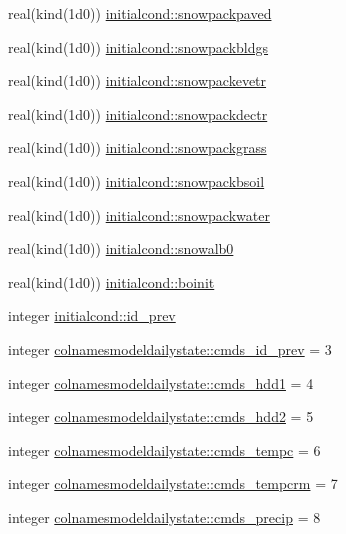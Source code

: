 \begin{DoxyCompactItemize}
real(kind(1d0)) \hyperlink{namespaceinitialcond_a032f3141b27c4888091a5d8ce505f6cb}{initialcond\+::snowpackpaved}
\item 
real(kind(1d0)) \hyperlink{namespaceinitialcond_a9a868a739685083b0593be6dbe85a45e}{initialcond\+::snowpackbldgs}
\item 
real(kind(1d0)) \hyperlink{namespaceinitialcond_a05602f6c4a611d494dd26c2f617307be}{initialcond\+::snowpackevetr}
\item 
real(kind(1d0)) \hyperlink{namespaceinitialcond_ac930faf4b87e883e788bb46e4e495bdb}{initialcond\+::snowpackdectr}
\item 
real(kind(1d0)) \hyperlink{namespaceinitialcond_a99c6060a146af926b3c850a3ff3e521d}{initialcond\+::snowpackgrass}
\item 
real(kind(1d0)) \hyperlink{namespaceinitialcond_ab04d6bfb1300cff5f2870d1a66d86058}{initialcond\+::snowpackbsoil}
\item 
real(kind(1d0)) \hyperlink{namespaceinitialcond_a392484bbee039fe1f1fcf3a3e972254d}{initialcond\+::snowpackwater}
\item 
real(kind(1d0)) \hyperlink{namespaceinitialcond_a645991fe3858b2fa2ecc195ca83e624c}{initialcond\+::snowalb0}
\item 
real(kind(1d0)) \hyperlink{namespaceinitialcond_a85ca43d1e5c8bfe458e5e9d0e806f672}{initialcond\+::boinit}
\item 
integer \hyperlink{namespaceinitialcond_ab4535354b38e73f2157ff80353984f72}{initialcond\+::id\+\_\+prev}
\item 
integer \hyperlink{namespacecolnamesmodeldailystate_a335cf41e0a1c85c5c2fed9ef1d49f614}{colnamesmodeldailystate\+::cmds\+\_\+id\+\_\+prev} = 3
\item 
integer \hyperlink{namespacecolnamesmodeldailystate_a066a4d377151c681eaf60edda9bea9f7}{colnamesmodeldailystate\+::cmds\+\_\+hdd1} = 4
\item 
integer \hyperlink{namespacecolnamesmodeldailystate_aa76bc4be1b7d076d0130aa43bdd879e3}{colnamesmodeldailystate\+::cmds\+\_\+hdd2} = 5
\item 
integer \hyperlink{namespacecolnamesmodeldailystate_a0c3257aec7f5bbd0c9b19c6ce253b4e9}{colnamesmodeldailystate\+::cmds\+\_\+tempc} = 6
\item 
integer \hyperlink{namespacecolnamesmodeldailystate_a953f3684887b76a61b94852e3f5af136}{colnamesmodeldailystate\+::cmds\+\_\+tempcrm} = 7
\item 
integer \hyperlink{namespacecolnamesmodeldailystate_a26b2e557c09f0e303cd47ce11fc6f1fd}{colnamesmodeldailystate\+::cmds\+\_\+precip} = 8

\end{DoxyCompactItemize}
